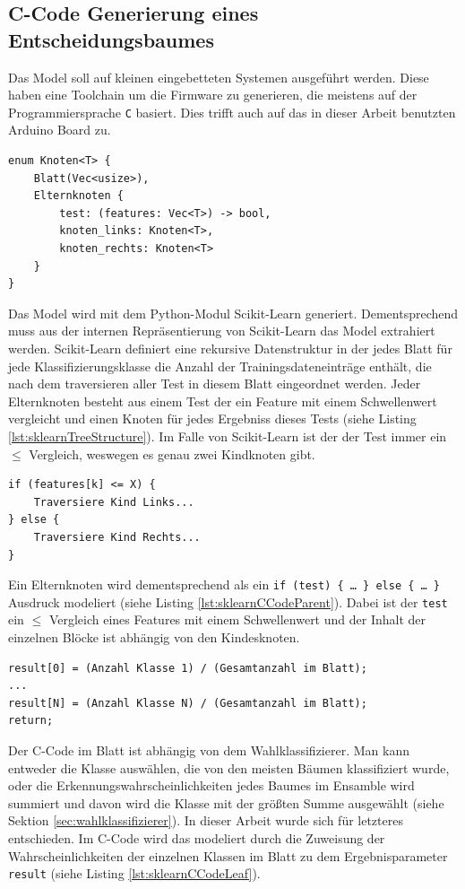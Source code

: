 \subsection{C-Code Generierung eines Entscheidungsbaumes}
Das Model soll auf kleinen eingebetteten Systemen ausgeführt werden. Diese haben eine Toolchain um die Firmware zu generieren, die meistens auf der Programmiersprache \texttt{C} basiert. Dies trifft auch auf das in
dieser Arbeit benutzten Arduino Board zu.
\begin{lstlisting}[label=lst:sklearnTreeStructure,caption={Skizze der rekursiven Datenstruktur für Entscheidungsbäume die von Scikit-Learn genutzt wird.}]
enum Knoten<T> {
    Blatt(Vec<usize>),
    Elternknoten {
        test: (features: Vec<T>) -> bool,
        knoten_links: Knoten<T>,
        knoten_rechts: Knoten<T>
    }
}
\end{lstlisting}
Das Model wird mit dem Python-Modul Scikit-Learn generiert. Dementsprechend muss aus der internen Repräsentierung von Scikit-Learn das Model extrahiert werden. Scikit-Learn definiert eine rekursive Datenstruktur in
der jedes Blatt für jede Klassifizierungsklasse die Anzahl der Trainingsdateneinträge enthält, die nach dem traversieren aller Test in diesem Blatt eingeordnet werden. Jeder Elternknoten besteht aus einem Test der
ein Feature mit einem Schwellenwert vergleicht und einen Knoten für jedes Ergebniss dieses Tests (siehe Listing \ref{lst:sklearnTreeStructure}). Im Falle von Scikit-Learn ist der der Test immer
ein $\leq$ Vergleich, weswegen es genau zwei Kindknoten gibt.
\begin{lstlisting}[label=lst:sklearnCCodeParent,caption={C-Code eines Elternknotens.}]
if (features[k] <= X) {
    Traversiere Kind Links...
} else {
    Traversiere Kind Rechts...
}
\end{lstlisting}
Ein Elternknoten wird dementsprechend als ein \texttt{if (test) \{ \ldots\ \} else \{ \ldots\ \}} Ausdruck modeliert (siehe Listing \ref{lst:sklearnCCodeParent}). Dabei ist der \texttt{test} ein $\leq$ Vergleich eines
Features mit einem Schwellenwert und der Inhalt der einzelnen Blöcke ist abhängig von den Kindesknoten.
\begin{lstlisting}[label=lst:sklearnCCodeLeaf,caption={C-Code eines Blattes.}]
result[0] = (Anzahl Klasse 1) / (Gesamtanzahl im Blatt);
...
result[N] = (Anzahl Klasse N) / (Gesamtanzahl im Blatt);
return;
\end{lstlisting}
Der C-Code im Blatt ist abhängig von dem Wahlklassifizierer. Man kann entweder die Klasse auswählen, die von den meisten Bäumen klassifiziert wurde, oder die
Erkennungswahrscheinlichkeiten jedes Baumes im Ensamble wird summiert und davon wird die Klasse mit der größten Summe ausgewählt (siehe Sektion \ref{sec:wahlklassifizierer}).
In dieser Arbeit wurde sich für letzteres entschieden. Im C-Code wird das modeliert durch die Zuweisung der Wahrscheinlichkeiten der einzelnen Klassen im Blatt zu dem Ergebnisparameter
\texttt{result} (siehe Listing \ref{lst:sklearnCCodeLeaf}).

